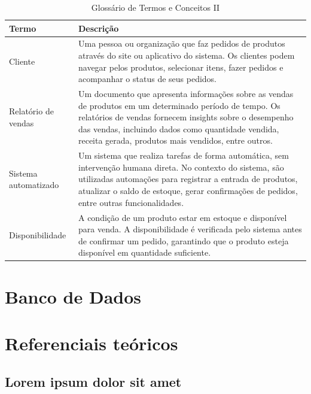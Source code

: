 \documentclass[
	12pt,				%
	openright,			%
	twoside,			%
	a4paper,			%
	english,			%
	brazil				%
	]{abntex2}
\begin{document}
\begin{table}[htb]
	\centering
	\caption{\label{tab:glossarioII}Glossário de Termos e Conceitos II}
	\begin{tabular}{|p{3.5cm}|p{10cm}|}
		\hline
		\textbf{Termo} & \textbf{Descrição} \\
			\hline
			Cliente & Uma pessoa ou organização que faz pedidos de produtos através do site ou aplicativo do sistema. Os clientes podem navegar pelos produtos, selecionar itens, fazer pedidos e acompanhar o status de seus pedidos. \\
			\hline
			Relatório de vendas & Um documento que apresenta informações sobre as vendas de produtos em um determinado período de tempo. Os relatórios de vendas fornecem insights sobre o desempenho das vendas, incluindo dados como quantidade vendida, receita gerada, produtos mais vendidos, entre outros. \\
			\hline
			Sistema automatizado & Um sistema que realiza tarefas de forma automática, sem intervenção humana direta. No contexto do sistema, são utilizadas automações para registrar a entrada de produtos, atualizar o saldo de estoque, gerar confirmações de pedidos, entre outras funcionalidades. \\
			\hline
			Disponibilidade & A condição de um produto estar em estoque e disponível para venda. A disponibilidade é verificada pelo sistema antes de confirmar um pedido, garantindo que o produto esteja disponível em quantidade suficiente. \\
			\hline
	\end{tabular}
\end{table}

\part{Banco de Dados}

\part{Referenciais teóricos}

\chapter{Lorem ipsum dolor sit amet}
\end{document}
